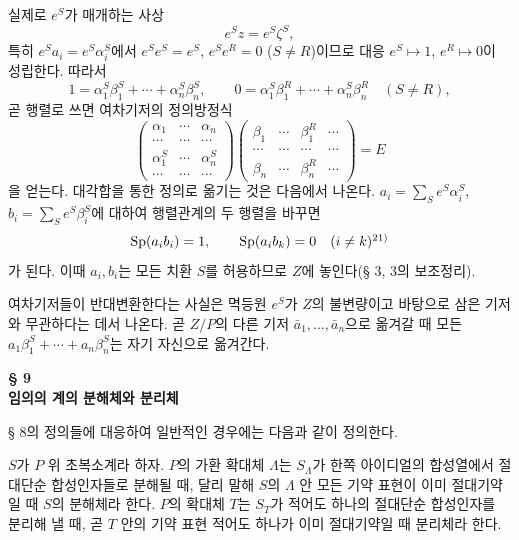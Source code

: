 실제로 \(e^S\)가 매개하는 사상
\[
e^Sz=e^S\zeta^S,
\]
특히 \(e^Sa_i=e^S\alpha_i^S\)에서 \(e^Se^S=e^S\), \(e^Se^R=0\) (\(S\ne R\))이므로 대응 \(e^S\mapsto1\), \(e^R\mapsto0\)이 성립한다. 따라서
\[
1=\alpha_1^S\beta_1^S+\cdots+\alpha_n^S\beta_n^S,\qquad
0=\alpha_1^S\beta_1^R+\cdots+\alpha_n^S\beta_n^R\quad(S\ne R),
\]
곧 행렬로 쓰면 여차기저의 정의방정식
\[
\begin{pmatrix}
\alpha_1&\cdots&\alpha_n\\
\cdots&\cdots&\cdots\\
\alpha_1^S&\cdots&\alpha_n^S\\
\cdots&\cdots&\cdots
\end{pmatrix}
\begin{pmatrix}
\beta_1&\cdots&\beta_1^R&\cdots\\
\cdots&\cdots&\cdots&\cdots\\
\beta_n&\cdots&\beta_n^R&\cdots
\end{pmatrix}
=E
\]
을 얻는다. 대각합을 통한 정의로 옮기는 것은 다음에서 나온다. \(a_i=\sum_S e^S\alpha_i^S\), \(b_i=\sum_S e^S\beta_i^S\)에 대하여 행렬관계의 두 행렬을 바꾸면
\[
\Sp(a_i b_i)=1,\qquad
\Sp(a_i b_k)=0\quad(i\ne k)\srcfnmark{21)}
\]
가 된다.
이때 \(a_i,b_i\)는 모든 치환 \(S\)를 허용하므로 \(Z\)에 놓인다(§ 3, 3의 보조정리).

여차기저들이 반대변환한다는 사실은 멱등원 \(e^S\)가 \(Z\)의 불변량이고 바탕으로 삼은 기저와 무관하다는 데서 나온다. 곧 \(Z/P\)의 다른 기저 \(\bar a_1,\ldots,\bar a_n\)으로 옮겨갈 때 모든 \(a_1\beta_1^S+\cdots+a_n\beta_n^S\)는 자기 자신으로 옮겨간다.

\begin{center}
\textbf{§ 9}\\[0.8ex]
\textbf{임의의 계의 분해체와 분리체}
\end{center}

\noindent\textbf{}
§ 8의 정의들에 대응하여 일반적인 경우에는 다음과 같이 정의한다.

\noindent\textbf{} \(S\)가 \(P\) 위 초복소계라 하자. \(P\)의 가환 확대체 \(\Lambda\)는 \(S_\Lambda\)가 한쪽 아이디얼의 합성열에서 절대단순 합성인자들로 분해될 때, 달리 말해 \(S\)의 \(\Lambda\) 안 모든 기약 표현이 이미 절대기약일 때 \(S\)의 분해체라 한다. \(P\)의 확대체 \(T\)는 \(S_T\)가 적어도 하나의 절대단순 합성인자를 분리해 낼 때, 곧 \(T\) 안의 기약 표현 적어도 하나가 이미 절대기약일 때 분리체라 한다.

